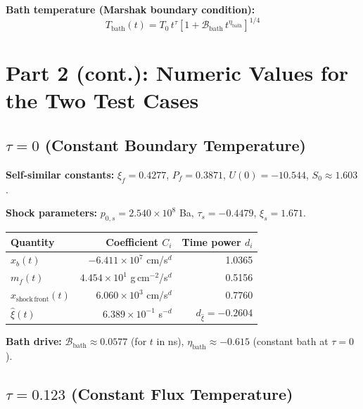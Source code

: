 \documentclass[11pt]{article}
\newcommand{\xsi}{\xi}
\newcommand{\xsif}{\xi_f}
\newcommand{\xsis}{\xi_s}
\begin{document}
\textbf{Bath temperature (Marshak boundary condition):}
\begin{equation}
  \boxed{T_{\mathrm{bath}}(t) = T_0\,t^{\tau}
  \left[1 + \mathcal{B}_{\mathrm{bath}}\,t^{\eta_{\mathrm{bath}}}\right]^{1/4}}
\end{equation}

\section{Part 2 (cont.): Numeric Values for the Two Test Cases}
\label{sec:numeric}

\subsection{$\tau = 0$ (Constant Boundary Temperature)}

\textbf{Self-similar constants:}
$\xsif = 0.4277$, \quad $P_f = 0.3871$, \quad $U(0) = -10.544$, \quad $S_0 \approx 1.603$.

\textbf{Shock parameters:}
$p_{0,s} = 2.540\times10^{8}$ Ba, \quad $\tau_s = -0.4479$, \quad $\xsis = 1.671$.

\begin{center}
\begin{tabular}{l r r}
\toprule
Quantity & Coefficient $C_i$ & Time power $d_i$ \\
\midrule
$x_b(t)$ & $-6.411 \times 10^{7}$ cm/s$^{d}$ & 1.0365 \\
$m_f(t)$ & $4.454 \times 10^{1}$ g\,cm$^{-2}$/s$^{d}$ & 0.5156 \\
$x_{\mathrm{shock\,front}}(t)$ & $6.060 \times 10^{3}$ cm/s$^{d}$ & 0.7760 \\
$\hat{\xsi}(t)$ & $6.389\times10^{-1}$ s$^{-d}$ & $d_{\hat{\xsi}} = -0.2604$ \\
\bottomrule
\end{tabular}
\end{center}

\textbf{Bath drive:}
$\mathcal{B}_{\mathrm{bath}} \approx 0.0577$ (for $t$ in ns), \quad $\eta_{\mathrm{bath}} \approx -0.615$ (constant bath at $\tau=0$).

\subsection{$\tau = 0.123$ (Constant Flux Temperature)}
\end{document}
